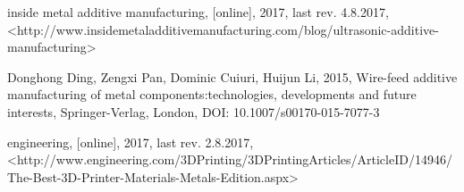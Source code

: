 \documentclass[a4paper, twoside, 11pt]{report}
\begin{document}
\begin{thebibliography}{99}
	inside metal additive manufacturing,
	[online],
	2017,
	last rev. 4.8.2017,
	<http://www.insidemetaladditivemanufacturing.com/blog/ultrasonic-additive-manufacturing>

	Donghong Ding, Zengxi Pan, Dominic Cuiuri, Huijun Li,
	2015,
	Wire-feed additive manufacturing of metal components:technologies, developments and future interests,
	Springer-Verlag,
	London,
	DOI: 10.1007/s00170-015-7077-3
	
	engineering,
	[online],
	2017,
	last rev. 2.8.2017,
	<http://www.engineering.com/3DPrinting/3DPrintingArticles/ArticleID/14946/The-Best-3D-Printer-Materials-Metals-Edition.aspx>
	
\end{thebibliography}
\end{document}
